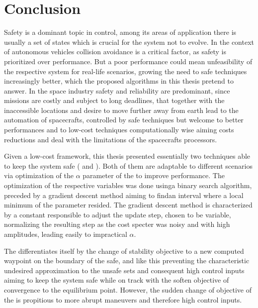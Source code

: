 
%

\chapter{Conclusion}
\label{cha:conclusion}

Safety is a dominant topic in control, among its areas of application there is usually a set of states which is crucial for the system not to evolve. In the context of autonomous vehicles collision avoidance is a critical factor, as safety is prioritized over performance. But a poor performance could mean unfeasibility of the respective system for real-life scenarios, growing the need to safe techniques increasingly better, which the proposed algorithms in this thesis pretend to answer. In the space industry safety and reliability are predominant, since missions are costly and subject to long deadlines, that together with the inaccessible locations and desire to move further away from earth lead to the automation of spacecrafts, controlled by safe techniques but welcome to better performances and to low-cost techniques computationally wise aiming costs reductions and deal with the limitations of the spacecrafts processors.


Given a low-cost  framework, this thesis presented essentially two techniques able to keep the system safe ( and ). Both of them are adaptable to different scenarios via optimization of the \(\alpha\) parameter of the  to improve performance. The optimization of the respective variables was done usinga binary search algorithm, preceded by a gradient descent method aiming to findan interval where a local minimum of the parameter resided. The gradient descent method is characterized by a constant responsible to adjust the update step, chosen to be variable, normalizing the resulting step as the cost specter was noisy and with high amplitudes, leading easily to impractical \(\alpha\). 


The  differentiates itself by the change of stability objective to a new computed waypoint on the boundary of the safe, and like this preventing the characteristic  undesired approximation to the unsafe sets and consequent high control inputs aiming to keep the system safe while on track with the soften objective of convergence to the equilibrium point. However, the sudden change of objective of the  is propitious to more abrupt maneuvers and therefore high control inputs.   

